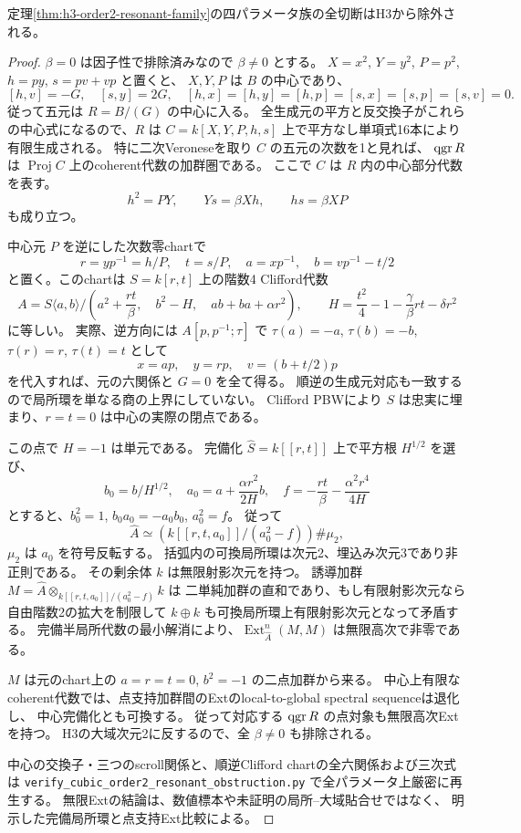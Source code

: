 \begin{theorem}[共鳴族には固定した局所無限Ext点がある]
\label{thm:h3-order2-resonant-excluded}
定理\ref{thm:h3-order2-resonant-family}の四パラメータ族の全切断はH3から除外される。
\end{theorem}
\begin{proof}
$\beta=0$ は因子性で排除済みなので $\beta\ne0$ とする。
$X=x^2$, $Y=y^2$, $P=p^2$, $h=py$, $s=pv+vp$ と置くと、
$X,Y,P$ は $B$ の中心であり、
\[
 [h,v]=-G,\quad [s,y]=2G,\quad
 [h,x]=[h,y]=[h,p]=[s,x]=[s,p]=[s,v]=0.
\]
従って五元は $R=B/(G)$ の中心に入る。
全生成元の平方と反交換子がこれらの中心式になるので、$R$ は
$C=k[X,Y,P,h,s]$ 上で平方なし単項式16本により有限生成される。
特に二次Veroneseを取り $C$ の五元の次数を1と見れば、
$\operatorname{qgr} R$ は $\operatorname{Proj}C$ 上のcoherent代数の加群圏である。
ここで $C$ は $R$ 内の中心部分代数を表す。
\[
 h^2=PY,\qquad Ys=\beta Xh,\qquad hs=\beta XP
\]
も成り立つ。

中心元 $P$ を逆にした次数零chartで
\[
 r=yp^{-1}=h/P,\quad t=s/P,\quad
 a=xp^{-1},\quad b=vp^{-1}-t/2
\]
と置く。このchartは $S=k[r,t]$ 上の階数4 Clifford代数
\[
 A=S\langle a,b\rangle/
 \left(a^2+\frac{rt}{\beta},\quad
 b^2-H,\quad ab+ba+\alpha r^2\right),
 \qquad
 H=\frac{t^2}{4}-1-\frac\gamma\beta rt-\delta r^2
\]
に等しい。
実際、逆方向には $A[p,p^{-1};\tau]$ で
$\tau(a)=-a$, $\tau(b)=-b$, $\tau(r)=r$, $\tau(t)=t$ として
\[
 x=ap,\quad y=rp,\quad v=(b+t/2)p
\]
を代入すれば、元の六関係と $G=0$ を全て得る。
順逆の生成元対応も一致するので局所環を単なる商の上界にしていない。
Clifford PBWにより $S$ は忠実に埋まり、$r=t=0$ は中心の実際の閉点である。

この点で $H=-1$ は単元である。
完備化 $\widehat S=k[[r,t]]$ 上で平方根 $H^{1/2}$ を選び、
\[
 b_0=b/H^{1/2},\quad
 a_0=a+\frac{\alpha r^2}{2H}b,\quad
 f=-\frac{rt}{\beta}-\frac{\alpha^2r^4}{4H}
\]
とすると、$b_0^2=1$, $b_0a_0=-a_0b_0$, $a_0^2=f$。
従って
\[
 \widehat A\simeq
 \left(k[[r,t,a_0]]/(a_0^2-f)\right)\#\mu_2,
\]
$\mu_2$ は $a_0$ を符号反転する。
括弧内の可換局所環は次元2、埋込み次元3であり非正則である。
その剰余体 $k$ は無限射影次元を持つ。
誘導加群 $M=\widehat A\otimes_{k[[r,t,a_0]]/(a_0^2-f)}k$ は
二単純加群の直和であり、もし有限射影次元なら自由階数2の拡大を制限して
$k\oplus k$ も可換局所環上有限射影次元となって矛盾する。
完備半局所代数の最小解消により、$\operatorname{Ext}^n_{\widehat A}(M,M)$ は無限高次で非零である。

$M$ は元のchart上の $a=r=t=0$, $b^2=-1$ の二点加群から来る。
中心上有限なcoherent代数では、点支持加群間のExtのlocal-to-global spectral sequenceは退化し、
中心完備化とも可換する。
従って対応する $\operatorname{qgr} R$ の点対象も無限高次Extを持つ。
H3の大域次元2に反するので、全 $\beta\ne0$ も排除される。

中心の交換子・三つのscroll関係と、順逆Clifford chartの全六関係および三次式は
\texttt{verify\_\allowbreak{}cubic\_\allowbreak{}order2\_\allowbreak{}resonant\_\allowbreak{}obstruction.py}
で全パラメータ上厳密に再生する。
無限Extの結論は、数値標本や未証明の局所--大域貼合せではなく、
明示した完備局所環と点支持Ext比較による。
\end{proof}


